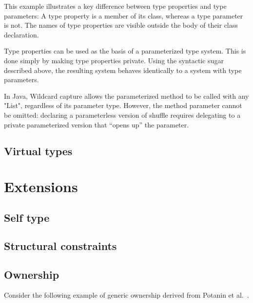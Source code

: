 \documentclass[preprint,nocopyrightspace,9pt]{sigplanconf}
\begin{document}
This example illustrates a key difference between type properties
and type parameters:
A type property is a member of its class, whereas a type parameter is
not.  The names of type properties are visible outside the body of
their class declaration.

Type properties can be used as the basis of a parameterized type
system.  This is done simply by making type properties private.
Using the syntactic sugar described above,
the resulting system behaves identically to a system with type
parameters.
\fi

In Java,
Wildcard
capture allows the parameterized method to be called with any \xcd"List",
regardless of its parameter type.
However,
the method parameter cannot be omitted: declaring a parameterless version
of shuffle requires delegating to a private parameterized version that
``opens up'' the parameter.

\subsection{Virtual types}

\section{Extensions}

\subsection{Self type}

\subsection{Structural constraints}


\subsection{Ownership}

Consider the following example of generic ownership
derived from Potanin et al.~\cite{ogj-oopsla06}.
\end{document}
